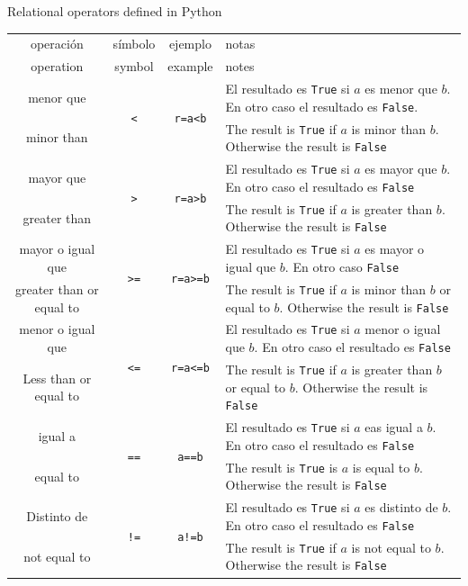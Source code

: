 \begin{table}[h]
{Relational operators defined in Python}\label{tabrel}
\centering
\begin{tabular}{cccm{7cm}}
\hline
\hline
operación&símbolo&ejemplo&notas\\
operation&symbol&example&notes\\
\hline
menor que &\multirow{2}{*}{\texttt{<}}&\multirow{2}{*}{\texttt{r=a<b}}&El resultado es \texttt{True} si $a$ es menor que $b$. En otro caso el resultado es \texttt{False}. \\
minor than &&& The result is \texttt{True} if $a$ is minor than $b$. Otherwise the result is \texttt{False}\\
\hline
mayor que&\multirow{2}{*}{\texttt{>}}&\multirow{2}{*}{\texttt{r=a>b}}& El resultado es \texttt{True} si $a$ es mayor que $b$. En otro caso el resultado es \texttt{False}\\ 
greater than&&& The result is \texttt{True} if $a$ is greater than $b$. Otherwise the result is \texttt{False} \\
\hline
mayor o igual que&\multirow{2}{*}{\texttt{>=}}&\multirow{2}{*}{\texttt{r=a>=b}}&El resultado es \texttt{True} si $a$  es mayor o igual que $b$. En otro caso \texttt{False}\\ 
greater than or equal to&&& The result is \texttt{True} if $a$ is minor than $b$ or equal to $b$. Otherwise the result is \texttt{False}\\
\hline
menor o igual que&\multirow{2}{*}{\texttt{<=}}&\multirow{2}{*}{\texttt{r=a<=b}}&El resultado es \texttt{True} si $a$ menor o igual que $b$. En otro caso el resultado es \texttt{False}\\ 
Less than or equal to&&& The result is \texttt{True} if $a$ is greater than $b$ or equal to $b$. Otherwise the result is \texttt{False}\\
\hline
igual a&\multirow{2}{*}{\texttt{==}}&\multirow{2}{*}{\texttt{a==b}}&El resultado es \texttt{True} si $a$ eas igual a $b$. En otro caso el resultado es \texttt{False}\\ 
equal to &&& The result is \texttt{True} is $a$ is equal to $b$. Otherwise the result is \texttt{False}\\
\hline
Distinto de& \multirow{2}{*}{\texttt{!=}}& \multirow{2}{*}{\texttt{a!=b}}&El resultado es \texttt{True} si $a$ es distinto de $b$. En otro caso el resultado es \texttt{False}\\ 
not equal to&&& The result is \texttt{True} if $a$ is not equal to $b$. Otherwise the result is \texttt{False}\\
\hline
\hline
\end{tabular}
\end{table} 

